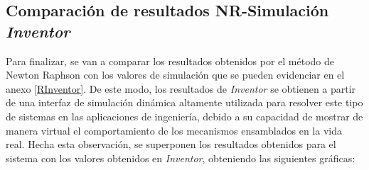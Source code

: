 \documentclass[12pt]{article}
\begin{document}
\subsection{Comparación de resultados NR-Simulación \textit{Inventor}}
Para finalizar, se van a comparar los resultados obtenidos por el método de Newton Raphson con los valores de simulación que se pueden evidenciar en el anexo \ref{RInventor}. De este modo, los resultados de \textit{Inventor} se obtienen a partir de una interfaz de simulación dinámica altamente utilizada para resolver este tipo de sistemas en las aplicaciones de ingeniería, debido a su capacidad de mostrar de manera virtual el comportamiento de los mecanismos ensamblados en la vida real. Hecha esta observación, se superponen los resultados obtenidos para el sistema con los valores obtenidos en \textit{Inventor}, obteniendo las siguientes gráficas: 
\end{document}
